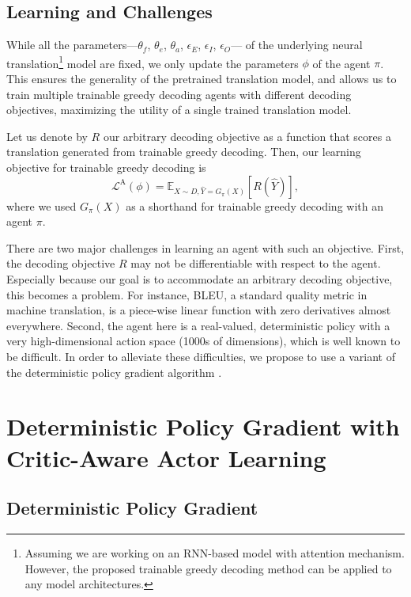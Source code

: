 \subsection{Learning and Challenges}
While all the parameters---$\theta_f$, $\theta_e$, $\theta_a$, $\epsilon_E$, $\epsilon_I$, $\epsilon_O$--- of the underlying neural translation\footnote{Assuming we are working on an RNN-based \sts model with attention mechanism. However, the proposed trainable greedy decoding method can be applied to any model architectures.} model are fixed, we only update the parameters $\phi$ of the agent $\pi$. This ensures the generality of the pretrained translation model, and allows us to train multiple trainable greedy decoding agents with different decoding objectives, maximizing the utility of a single trained translation model. 

Let us denote by $R$ our arbitrary decoding objective as a function that scores a translation generated from trainable greedy decoding. Then, our learning objective for trainable greedy decoding is 
\begin{equation}
\mathcal{L}^{\text{A}}(\phi) = \mathbb{E}_{X \sim D, \hat{Y}=G_{\pi}(X)}\left[R(\hat{Y})\right],
\end{equation}
where we used $G_{\pi}(X)$ as a shorthand for trainable greedy decoding with an agent $\pi$. 

There are two major challenges in learning an agent with such an objective. First, the decoding objective $R$ may not be differentiable with respect to the agent. Especially because our goal is to accommodate an arbitrary decoding objective, this becomes a problem. For instance, BLEU, a standard quality metric in machine translation, is a piece-wise linear function with zero derivatives almost everywhere. Second, the agent here is a real-valued, deterministic policy with a very high-dimensional action space (1000s of dimensions), which is well known to be difficult. In order to alleviate these difficulties, we propose to use a variant of the deterministic policy gradient algorithm \citep{silver2014deterministic,lillicrap2015continuous}.



\section{Deterministic Policy Gradient  with Critic-Aware Actor Learning}

\subsection{Deterministic Policy Gradient}

